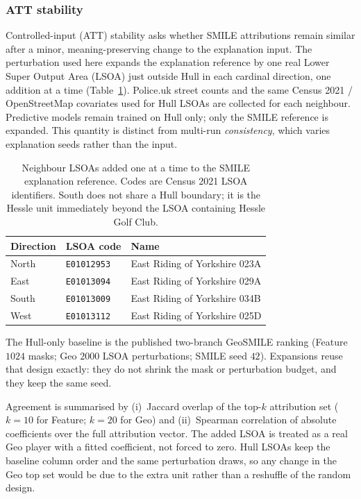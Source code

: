 \subsubsection{ATT stability}
\label{sec:hull_att_stability}

Controlled-input (ATT) stability asks whether SMILE attributions remain similar after a
minor, meaning-preserving change to the explanation input.
The perturbation used here expands the explanation reference by one real Lower Super
Output Area (LSOA) just outside Hull in each cardinal direction, one addition at a time
(Table~\ref{tab:hull_att_stability_neighbors}).
Police.uk street counts and the same Census 2021 / OpenStreetMap covariates used for
Hull LSOAs are collected for each neighbour.
Predictive models remain trained on Hull only; only the SMILE reference is expanded.
This quantity is distinct from multi-run \emph{consistency}, which varies explanation
seeds rather than the input.

\begin{table}[htbp]
\centering
\caption{Neighbour LSOAs added one at a time to the SMILE explanation reference.
Codes are Census 2021 LSOA identifiers.
South does not share a Hull boundary; it is the Hessle unit immediately beyond the
LSOA containing Hessle Golf Club.}
\label{tab:hull_att_stability_neighbors}
\begin{tabular}{lll}
\toprule
Direction & LSOA code & Name \\
\midrule
North & \texttt{E01012953} & East Riding of Yorkshire 023A \\
East  & \texttt{E01013094} & East Riding of Yorkshire 029A \\
South & \texttt{E01013009} & East Riding of Yorkshire 034B \\
West  & \texttt{E01013112} & East Riding of Yorkshire 025D \\
\bottomrule
\end{tabular}
\end{table}
\FloatBarrier

The Hull-only baseline is the published two-branch GeoSMILE ranking
(Feature $1024$ masks; Geo $2000$ LSOA perturbations; SMILE seed $42$).
Expansions reuse that design exactly: they do not shrink the mask or perturbation
budget, and they keep the same seed.

Agreement is summarised by
(i)~Jaccard overlap of the top-$k$ attribution set
($k{=}10$ for Feature; $k{=}20$ for Geo) and
(ii)~Spearman correlation of absolute coefficients over the full attribution vector.
The added LSOA is treated as a real Geo player with a fitted coefficient, not forced
to zero.
Hull LSOAs keep the baseline column order and the same perturbation draws, so any
change in the Geo top set would be due to the extra unit rather than a reshuffle of
the random design.

